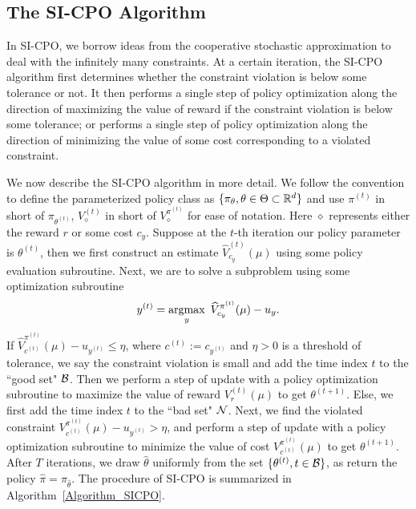 \subsection{The SI-CPO Algorithm}\label{Section_SICPO}
In SI-CPO, we borrow ideas from the cooperative stochastic approximation \citep{lan2020algorithms, wei2020comirror} to deal with the infinitely many constraints.
At a certain iteration, the SI-CPO algorithm first determines whether the constraint violation is below some tolerance or not.
It then performs a single step of policy optimization along the direction of maximizing the value of reward if the constraint violation is below some tolerance;
or performs a single step of policy optimization along the direction of minimizing the value of some cost corresponding to a violated constraint.

We now describe the SI-CPO algorithm in more detail.
We follow the convention to define the parameterized policy class as $\{\pi_\theta,\theta\in\Theta\subset{\mathbb R}^d\}$ and use $\pi^{(t)}$ in short of $\pi_{\theta^{(t)}}$, $V_\diamond^{(t)}$ in short of $V_\diamond^{\pi^{(t)}}$ for ease of notation.
Here $\diamond$ represents either the reward $r$ or some cost $c_y$.
Suppose at the $t$-th iteration our policy parameter is $\theta^{(t)}$, then we first construct an estimate $\widehat V^{(t)}_{c_y}(\mu)$ using some policy evaluation subroutine.
Next, we are to solve a subproblem using some optimization subroutine
$$
y^{(t)}=\operatorname*{argmax}_y\ \widehat V_{c_y}^{\pi^{(t)}}(\mu)-u_y.
$$
If ${\widehat V_{c^{(t)}}^{\pi^{(t)}}(\mu)-u_{y^{(t)}}\leq \eta}$, where $c^{(t)}:=c_{y^{(t)}}$ and $\eta> 0$ is a threshold of tolerance, we say the constraint violation is small and add the time index $t$ to the ``good set" ${\mathcal{B}}$.
Then we perform a step of update with a policy optimization subroutine to maximize the value of reward $V_r^{(t)}(\mu)$ to get $\theta^{(t+1)}$.
Else, we first add the time index $t$ to the ``bad set" ${\mathcal{N}}$.
Next, we find the violated constraint ${V_{c^{(t)}}^{\pi^{(t)}}(\mu)-u_{y^{(t)}}>\eta}$, and perform a step of update with a policy optimization subroutine to minimize the value of cost $V_{c^{(t)}}^{\pi^{(t)}}(\mu)$ to get $\theta^{(t+1)}$.
After $T$ iterations, we draw $\hat\theta$ uniformly from the set ${\{\theta^{(t)},t\in{\mathcal{B}}\}}$, as return the policy ${\hat\pi=\pi_{\hat\theta}}$.
The procedure of SI-CPO  is summarized in Algorithm~\ref{Algorithm_SICPO}.


